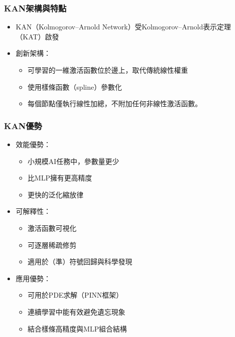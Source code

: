 \documentclass{beamer}
\begin{document}
\begin{frame}
    \frametitle{KAN架構與特點}
    \begin{itemize}
        \item KAN（Kolmogorov–Arnold Network）受Kolmogorov–Arnold表示定理（KAT）啟發
        \item 創新架構：
        \begin{itemize}
            \item 可學習的一維激活函數位於邊上，取代傳統線性權重
            \item 使用樣條函數（spline）參數化
            \item 每個節點僅執行線性加總，不附加任何非線性激活函數。
        \end{itemize}
    \end{itemize}
\end{frame}

\begin{frame}
    \frametitle{KAN優勢}
    \begin{itemize}
        \item 效能優勢：
        \begin{itemize}
            \item 小規模AI任務中，參數量更少
            \item 比MLP擁有更高精度
            \item 更快的泛化縮放律
        \end{itemize}
        \item 可解釋性：
        \begin{itemize}
            \item 激活函數可視化
            \item 可逐層稀疏修剪
            \item 適用於（準）符號回歸與科學發現
        \end{itemize}
        \item 應用優勢：
        \begin{itemize}
            \item 可用於PDE求解（PINN框架）
            \item 連續學習中能有效避免遺忘現象
            \item 結合樣條高精度與MLP組合結構
        \end{itemize}
    \end{itemize}
\end{frame}
\end{document}

